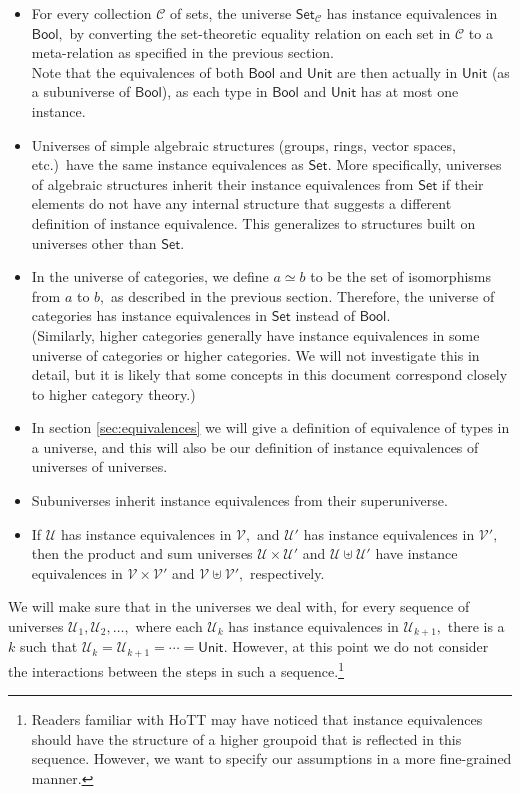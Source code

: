 \documentclass[a4paper]{article}
\theoremstyle{definition}
\theoremstyle{remark}
\renewcommand{\equiv}{\simeq}
\newcommand{\C}{\mathcal{C}}
\newcommand{\U}{\mathcal{U}}
\newcommand{\V}{\mathcal{V}}
\newcommand{\nm}{\mathsf}
\newcommand{\universe}{\nm}
\newcommand{\Unit}{\universe{Unit}}
\newcommand{\Bool}{\universe{Bool}}
\newcommand{\Set}{\universe{Set}}
\begin{document}
\begin{itemize}
  \item For every collection $\C$ of sets, the universe $\Set_\C$ has instance equivalences
  in $\Bool,$ by converting the set-theoretic equality relation on each set in $\C$ to a
  meta-relation as specified in the previous section.\\
  Note that the equivalences of both $\Bool$ and $\Unit$ are then actually in $\Unit$ (as a
  subuniverse of $\Bool$), as each type in $\Bool$ and $\Unit$ has at most one instance.
  \item Universes of simple algebraic structures (groups, rings, vector spaces, etc.)\ have
  the same instance equivalences as $\Set.$ More specifically, universes of algebraic
  structures inherit their instance equivalences from $\Set$ if their elements do not have
  any internal structure that suggests a different definition of instance equivalence.
  This generalizes to structures built on universes other than $\Set.$
  \item In the universe of categories, we define $a \equiv b$ to be the set of
  isomorphisms from $a$ to $b,$ as described in the previous section. Therefore, the
  universe of categories has instance equivalences in $\Set$ instead of $\Bool.$\\
  (Similarly, higher categories generally have instance equivalences in some universe of
  categories or higher categories. We will not investigate this in detail, but it is likely
  that some concepts in this document correspond closely to higher category theory.)
  \item In section \ref{sec:equivalences} we will give a definition of equivalence of types in
  a universe, and this will also be our definition of instance equivalences of universes of
  universes.
  \item Subuniverses inherit instance equivalences from their superuniverse.
  \item If $\U$ has instance equivalences in $\V,$ and $\U'$ has instance equivalences in
  $\V',$ then the product and sum universes $\U \times \U'$ and $\U \uplus \U'$ have instance
  equivalences in $\V \times \V'$ and $\V \uplus \V',$ respectively.
\end{itemize}

We will make sure that in the universes we deal with, for every sequence of universes
$\U_1, \U_2, \ldots,$ where each $\U_k$ has instance equivalences in $\U_{k+1},$ there is
a $k$ such that $\U_k = \U_{k+1} = \cdots = \Unit.$ However, at this point we do not consider
the interactions between the steps in such a sequence.\footnote{Readers familiar with HoTT may
have noticed that instance equivalences should have the structure of a higher groupoid that is
reflected in this sequence. However, we want to specify our assumptions in a more fine-grained
manner.}
\end{document}
